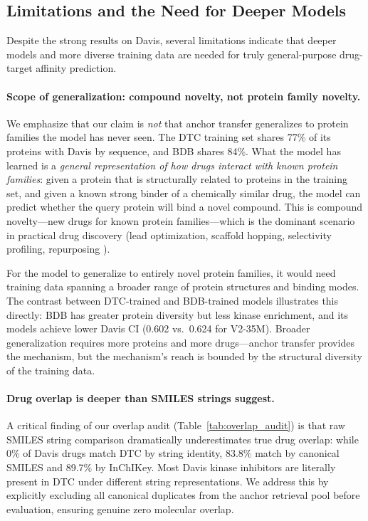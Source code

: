 \subsection{Limitations and the Need for Deeper Models}

Despite the strong results on Davis, several limitations indicate that deeper models and more diverse training data are needed for truly general-purpose drug-target affinity prediction.

\paragraph{Scope of generalization: compound novelty, not protein family novelty.}
We emphasize that our claim is \emph{not} that anchor transfer generalizes to protein families the model has never seen. The DTC training set shares 77\% of its proteins with Davis by sequence, and BDB shares 84\%. What the model has learned is a \emph{general representation of how drugs interact with known protein families}: given a protein that is structurally related to proteins in the training set, and given a known strong binder of a chemically similar drug, the model can predict whether the query protein will bind a novel compound. This is compound novelty---new drugs for known protein families---which is the dominant scenario in practical drug discovery (lead optimization, scaffold hopping, selectivity profiling, repurposing \cite{pushpakom2019drug_repurposing}).

For the model to generalize to entirely novel protein families, it would need training data spanning a broader range of protein structures and binding modes. The contrast between DTC-trained and BDB-trained models illustrates this directly: BDB has greater protein diversity but less kinase enrichment, and its models achieve lower Davis CI (0.602 vs.\ 0.624 for V2-35M). Broader generalization requires more proteins and more drugs---anchor transfer provides the mechanism, but the mechanism's reach is bounded by the structural diversity of the training data.

\paragraph{Drug overlap is deeper than SMILES strings suggest.}
A critical finding of our overlap audit (Table~\ref{tab:overlap_audit}) is that raw SMILES string comparison dramatically underestimates true drug overlap: while 0\% of Davis drugs match DTC by string identity, 83.8\% match by canonical SMILES and 89.7\% by InChIKey. Most Davis kinase inhibitors are literally present in DTC under different string representations. We address this by explicitly excluding all canonical duplicates from the anchor retrieval pool before evaluation, ensuring genuine zero molecular overlap.

